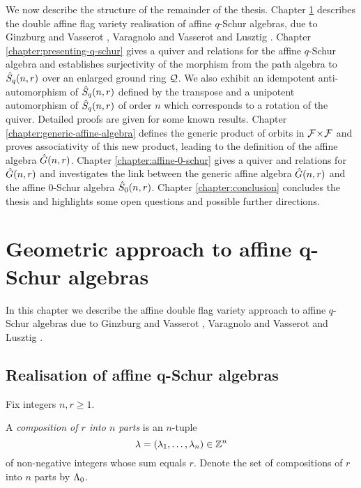 \documentclass[a4paper, 11pt, twoside]{report}
\begin{document}
We now describe the structure of the remainder of the thesis. Chapter \ref{chapter:lusztig-realisation} describes the double affine flag variety realisation of affine $q$-Schur algebras, due to Ginzburg and Vasserot \cite{ginzburg93}, Varagnolo and Vasserot \cite{varagnolo99} and Lusztig \cite{lusztig99}. Chapter \ref{chapter:presenting-q-schur} gives a quiver and relations for the affine $q$-Schur algebra and establishes surjectivity of the morphism from the path algebra to $\hat{S}_q(n,r)$ over an enlarged ground ring $\mathcal{Q}$. We also exhibit an idempotent anti-automorphism of $\hat{S}_q(n,r)$ defined by the transpose and a unipotent automorphism of $\hat{S}_q(n,r)$ of order $n$ which corresponds to a rotation of the quiver. Detailed proofs are given for some known results. Chapter \ref{chapter:generic-affine-algebra} defines the generic product of orbits in ${\mathcal{F}\!\times\!\mathcal{F}}$ and proves associativity of this new product, leading to the definition of the affine algebra $\hat{G}(n,r)$. Chapter \ref{chapter:affine-0-schur} gives a quiver and relations for $\hat{G}(n,r)$ and investigates the link between the generic affine algebra $\hat{G}(n,r)$ and the affine $0$-Schur algebra $\hat{S}_0(n,r)$. Chapter \ref{chapter:conclusion} concludes the thesis and highlights some open questions and possible further directions.


\chapter{Geometric approach to affine q-Schur algebras}\label{chapter:lusztig-realisation}

In this chapter we describe the affine double flag variety approach to affine $q$-Schur algebras due to Ginzburg and Vasserot \cite{ginzburg93}, Varagnolo and Vasserot \cite{varagnolo99} and Lusztig \cite{lusztig99}.

\section{Realisation of affine q-Schur algebras}
\renewcommand{\laurent}{\mathcal{S}}
\renewcommand{\polys}{\mathcal{R}}

Fix integers $n,r\geq 1$.

\begin{definition}\label{def:compositions}
A \emph{composition of $r$ into $n$ parts} is an $n$-tuple
\begin{equation*}
\lambda=(\lambda_1,\ldots,\lambda_n)\in\mathbb{Z}^n
\end{equation*}
of non-negative integers whose sum equals $r$. Denote the set of compositions of $r$ into $n$ parts by $\Lambda_0{}$.
\end{definition}
\end{document}
